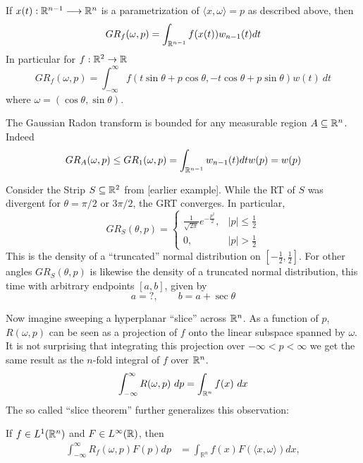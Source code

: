 \begin{myexample}
  If $x(t):\mathbb{R}^{n-1} \longrightarrow \mathbb{R}^n$ is a parametrization of $\langle x, \omega\rangle = p$ as described above, then
  \[
    GR_f(\omega, p) = \int_{\mathbb{R}^{n-1}}f(x(t)) w_{n-1}(t) dt
  \]
  In particular for $f:\mathbb{R}^2 \rightarrow \mathbb{R}$
  \[
    GR_f(\omega, p) = \int_{-\infty}^\infty f(t \sin \theta + p \cos \theta, -t \cos \theta + p \sin \theta) w(t)~dt
  \]
  where $\omega = (\cos \theta, \sin \theta)$.
\end{myexample}

\begin{myexample}
  The Gaussian Radon transform is bounded for any measurable region $A \subseteq \mathbb{R}^n$. Indeed 
  \[
      GR_A(\omega, p) \leq GR_1(\omega, p) = \int_{\mathbb{R}^{n-1}} w_{n-1}(t)dt w(p) = w(p)
  \]
\end{myexample}

\begin{myexample}
  Consider the Strip $S \subseteq \mathbb{R}^2$ from [earlier example]. While the RT of $S$ was divergent for $\theta = \pi/2$ or $3\pi/2$, the GRT converges. In particular,
  \[
    GR_S(\theta, p)
    = \begin{cases}
      \frac1{\sqrt{2\pi}}e^{-\frac{p^2}2}, & |p| \leq \frac12 \\
      0, & |p| > \frac12
    \end{cases}
  \]
  This is the density of a ``truncated'' normal distribution on $[-\frac12,\frac12]$. For other angles $GR_S(\theta, p)$ is likewise the density of a truncated normal distribution, this time with arbitrary endpoints $[a, b]$, given by
  \[
    a = ?, \qquad b = a + \sec\theta
  \]
\end{myexample}

Now imagine sweeping a hyperplanar ``slice'' across $\mathbb{R}^n$. As a function of $p$, $R(\omega, p)$ can be seen as a projection of $f$ onto the linear subspace spanned by $\omega$. It is not surprising that integrating this projection over $-\infty < p < \infty$ we get the same result as the $n$-fold integral of $f$ over $\mathbb{R}^n$.
\[
    \int_{-\infty}^\infty R(\omega, p) ~dp = \int_{\mathbb{R}^n} f(x) ~dx
\]
The so called ``slice theorem'' further generalizes this observation:

\begin{proposition}[Slice Theorem]
  If $f \in L^1(\mathbb{R}^n)$ and $F \in L^\infty(\mathbb{R})$, then
  \begin{align}
    \label{eq:ST}
    \int_{-\infty}^\infty R_f(\omega, p) F(p) dp 
    &= \int_{\mathbb{R}^n} f(x) F(\langle x, \omega \rangle) dx,
  \end{align}
\end{proposition}

